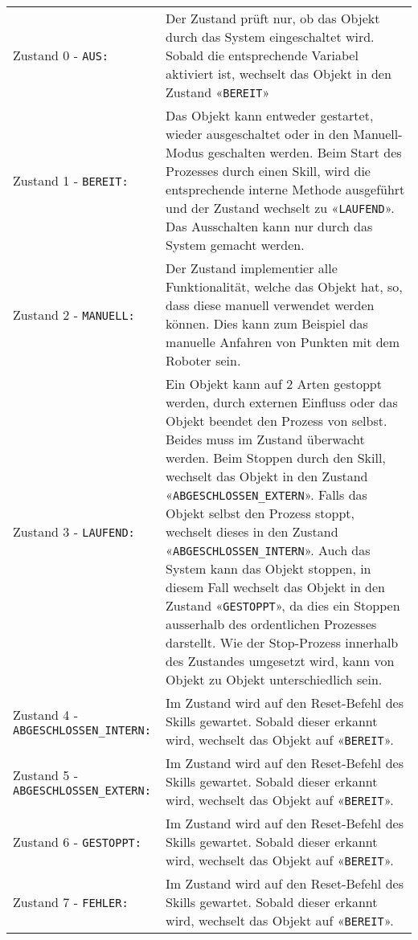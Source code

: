 		\begin{tabularx}{\textwidth}{@{}>{}p{16em} X@{}}
			Zustand 0 - \verb|AUS:| & 
			Der Zustand prüft nur, ob das Objekt durch das System eingeschaltet wird. Sobald die entsprechende Variabel aktiviert ist, wechselt das Objekt in den Zustand «\verb|BEREIT|» 
			\\
			Zustand 1 - \verb|BEREIT:| & 
			Das Objekt kann entweder gestartet, wieder ausgeschaltet oder in den Manuell-Modus geschalten werden. Beim Start des Prozesses durch einen Skill, wird die entsprechende interne Methode ausgeführt und der Zustand wechselt zu «\verb|LAUFEND|». Das Ausschalten kann nur durch das System gemacht werden.
			\\
			Zustand 2 - \verb|MANUELL:| & 
			Der Zustand implementier alle Funktionalität, welche das Objekt hat, so, dass diese manuell verwendet werden können. Dies kann zum Beispiel das manuelle Anfahren von Punkten mit dem Roboter sein.  
			\\
			Zustand 3 - \verb|LAUFEND:| & 
			Ein Objekt kann auf 2 Arten gestoppt werden, durch externen Einfluss oder das Objekt beendet den Prozess von selbst. Beides muss im Zustand überwacht werden. Beim Stoppen durch den Skill, wechselt das Objekt in den Zustand «\verb|ABGESCHLOSSEN_EXTERN|». Falls das Objekt selbst den Prozess stoppt, wechselt dieses in den Zustand «\verb|ABGESCHLOSSEN_INTERN|». Auch das System kann das Objekt stoppen, in diesem Fall wechselt das Objekt in den Zustand «\verb|GESTOPPT|», da dies ein Stoppen ausserhalb des ordentlichen Prozesses darstellt. Wie der Stop-Prozess innerhalb des Zustandes umgesetzt wird, kann von Objekt zu Objekt unterschiedlich sein.
			\\
			Zustand 4 - \verb|ABGESCHLOSSEN_INTERN:| & 
			Im Zustand wird auf den Reset-Befehl des Skills gewartet. Sobald dieser erkannt wird, wechselt das Objekt auf «\verb|BEREIT|». 
			\\
			Zustand 5 - \verb|ABGESCHLOSSEN_EXTERN:| & 
			Im Zustand wird auf den Reset-Befehl des Skills gewartet. Sobald dieser erkannt wird, wechselt das Objekt auf «\verb|BEREIT|».
			\\
			Zustand 6 - \verb|GESTOPPT:| & 
			Im Zustand wird auf den Reset-Befehl des Skills gewartet. Sobald dieser erkannt wird, wechselt das Objekt auf «\verb|BEREIT|».
			\\
			Zustand 7 - \verb|FEHLER:| & 
			Im Zustand wird auf den Reset-Befehl des Skills gewartet. Sobald dieser erkannt wird, wechselt das Objekt auf «\verb|BEREIT|».
			\\
		\end{tabularx}
		
